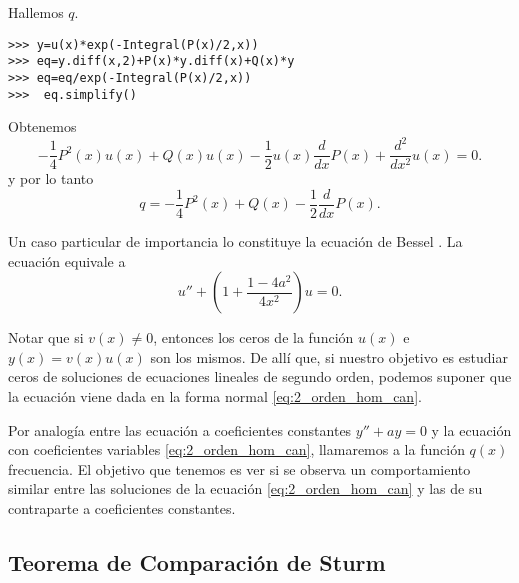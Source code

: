 Hallemos $q$.
\begin{lstlisting}
>>> y=u(x)*exp(-Integral(P(x)/2,x))
>>> eq=y.diff(x,2)+P(x)*y.diff(x)+Q(x)*y
>>> eq=eq/exp(-Integral(P(x)/2,x))
>>>  eq.simplify()
\end{lstlisting}


Obtenemos
\[\boxed{- \frac{1}{4} P^{2}{\left (x \right )} u{\left (x \right )} + Q{\left (x \right 
)} u{\left (x \right )} - \frac{1}{2} u{\left (x \right )} \frac{d}{d x} P{\left
 (x \right )} + \frac{d^{2}}{d x^{2}}  u{\left (x \right )}=0}.\]
y por lo tanto
\[\boxed{q=- \frac{1}{4} P^{2}{\left (x \right )} + Q{\left (x \right )} - \frac{1}{2} \frac{d}{d x} P{\left (x \right )}}.\]
 
\begin{ejemplo} Un caso particular de importancia lo constituye la ecuación de Bessel
 .
La ecuación equivale a
\begin{equation}\label{bessel_normal}\boxed{u''+\left(1+\frac{1-4a^2}{4x^2}\right)u=0}.
\end{equation}
\end{ejemplo}

Notar que si $v(x)\neq 0$, entonces los ceros de la función $u(x)$ e $y(x)=v(x)u(x)$ son los mismos. De allí que, si nuestro objetivo es estudiar ceros de soluciones de ecuaciones lineales de segundo orden, podemos suponer que la ecuación viene dada en la forma normal  \eqref{eq:2_orden_hom_can}.

Por  analogía  entre las ecuación a coeficientes constantes $y''+ay=0$ y la ecuación con coeficientes variables \eqref{eq:2_orden_hom_can}, llamaremos a la función $q(x)$ frecuencia. El objetivo que tenemos es ver si se observa un comportamiento similar entre las soluciones de la ecuación  \eqref{eq:2_orden_hom_can} y las de su contraparte a coeficientes constantes. 

\subsection{Teorema de Comparación de Sturm}

